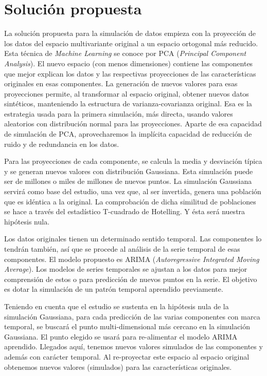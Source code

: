 \documentclass[11pt,spanish,listoffigures,listoftables]{tfgetsinf}
\begin{document}
\chapter{Solución propuesta}
La solución propuesta para la simulación de datos empieza con la proyección de los datos del espacio multivariante original a un espacio ortogonal más reducido. Esta técnica de {\em Machine Learning} se conoce por PCA ({\em Principal Component Analysis}). El nuevo espacio (con menos dimensiones) contiene las componentes que mejor explican los datos y las respectivas proyecciones de las características originales en esas componentes. La generación de nuevos valores para esas proyecciones permite, al transformar al espacio original, obtener nuevos datos sintéticos, manteniendo la estructura de varianza-covarianza original. Esa es la estrategia usada para la primera simulación, más directa, usando valores aleatorios con distribución normal para las proyecciones. Aparte de esa capacidad de simulación de PCA, aprovecharemos la implícita capacidad de reducción de ruido y de redundancia en los datos.

Para las proyecciones de cada componente, se calcula la media y desviación típica y se generan nuevos valores con distribución Gaussiana. Esta simulación puede ser de millones o miles de millones de nuevos puntos. La simulación Gaussiana servirá como base del estudio, una vez que, al ser invertida, genera una población que es idéntica a la original. La comprobación de dicha similitud de poblaciones se hace a través del estadístico T-cuadrado de Hotelling. Y ésta será nuestra hipótesis nula.

Los datos originales tienen un determinado sentido temporal. Las componentes lo tendrán también, así que se procede al análisis de la serie temporal de esas componentes. El modelo propuesto es ARIMA ({\em Autoregressive Integrated Moving Average}). Los modelos de series temporales se ajustan a los datos para mejor comprensión de estos o para predicción de nuevos puntos en la serie. El objetivo es dotar la simulación de un patrón temporal aprendido previamente.

Teniendo en cuenta que el estudio se sustenta en la hipótesis nula de la simulación Gaussiana, para cada predicción de las varias componentes con marca temporal, se buscará el punto multi-dimensional más cercano en la simulación Gaussiana. El punto elegido se usará para re-alimentar el modelo ARIMA aprendido. Llegados aquí, tenemos nuevos valores simulados de las componentes y además con carácter temporal. Al re-proyectar este espacio al espacio original obtenemos nuevos valores (simulados) para las características originales.
\end{document}
